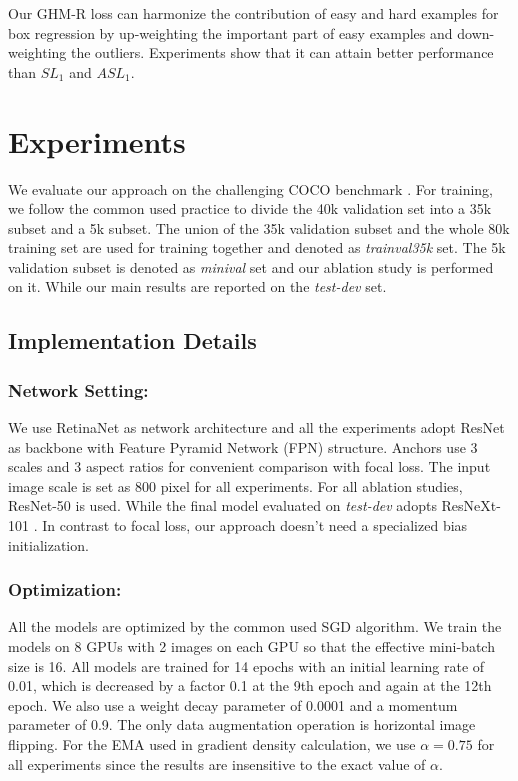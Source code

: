 \documentclass[letterpaper]{article} %
\begin{document}
Our GHM-R loss can harmonize the contribution of easy and hard examples for box regression by up-weighting the important part of easy examples and down-weighting the outliers.
Experiments show that it can attain better performance than $SL_1$ and $ASL_1$.



\section{Experiments}
We evaluate our approach on the challenging COCO benchmark \cite{coco}. For training, we follow the common used practice \cite{mask,focal} to divide the 40k validation set into a 35k subset and a 5k subset. The union of the 35k validation subset and the whole 80k training set are used for training together and denoted as \textit{trainval35k} set. The 5k validation subset is denoted as \textit{minival} set and our ablation study is performed on it. While our main results are reported on the \textit{test-dev} set.

\subsection{Implementation Details}
\subsubsection{Network Setting:} We use RetinaNet \cite{focal} as  network architecture and all the experiments adopt ResNet \cite{resnet} as backbone with Feature Pyramid Network (FPN) \cite{fpn} structure. Anchors use 3 scales and 3 aspect ratios for convenient comparison with focal loss. The input image scale is set as 800 pixel for all experiments. For all ablation studies, ResNet-50 is used. While the final model evaluated on \textit{test-dev} adopts ResNeXt-101 \cite{resnext}. In contrast to focal loss, our approach doesn't need a specialized bias initialization.

\subsubsection{Optimization:} All the models are optimized by the common used SGD algorithm. We train the models on 8 GPUs with 2 images on each GPU so that the effective mini-batch size is 16. All models are trained for 14 epochs with an initial learning rate of 0.01, which is decreased by a factor 0.1 at the 9th epoch and again at the 12th epoch. We also use a weight decay parameter of 0.0001 and a momentum parameter of 0.9. The only data augmentation operation is horizontal image flipping. For the EMA used in gradient density calculation, we use $\alpha=0.75$ for all experiments since the results are insensitive to the exact value of $\alpha$.
\end{document}
